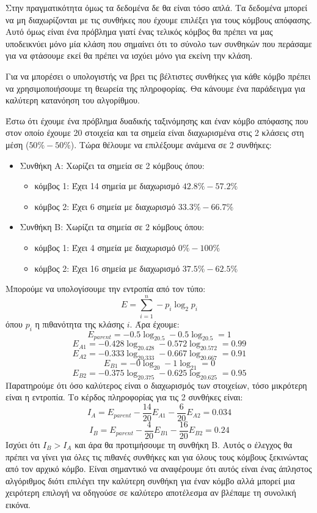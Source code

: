 Στην πραγματικότητα όμως τα δεδομένα δε θα είναι τόσο απλά. Τα δεδομένα μπορεί να μη διαχωρίζονται
με τις συνθήκες που έχουμε επιλέξει για τους κόμβους απόφασης. Αυτό όμως είναι ένα πρόβλημα γιατί
ένας τελικός κόμβος θα πρέπει να μας υποδεικνύει μόνο μία κλάση που σημαίνει ότι το σύνολο των
συνθηκών που περάσαμε για να φτάσουμε εκεί θα πρέπει να ισχύει μόνο για εκείνη την κλάση.

Για να μπορέσει ο υπολογιστής να βρει τις βέλτιστες συνθήκες για κάθε κόμβο πρέπει να
χρησιμοποιήσουμε τη θεωρεία της πληροφορίας. Θα κάνουμε ένα παράδειγμα για καλύτερη κατανόηση
του αλγορίθμου.

Έστω ότι έχουμε ένα πρόβλημα δυαδικής ταξινόμησης και έναν κόμβο απόφασης που στον οποίο έχουμε
20 στοιχεία και τα σημεία είναι διαχωρισμένα στις 2 κλάσεις στη μέση ($50\%-50\%$). Τώρα θέλουμε να
επιλέξουμε ανάμενα σε 2 συνθήκες:
\begin{itemize}
    \item Συνθήκη Α: Χωρίζει τα σημεία σε 2 κόμβους όπου:
    \begin{itemize}
        \item κόμβος 1: Έχει 14 σημεία με διαχωρισμό $42.8\%-57.2\%$
        \item κόμβος 2: Έχει 6 σημεία με διαχωρισμό $33.3\%-66.7\%$
    \end{itemize}
    \item Συνθήκη Β: Χωρίζει τα σημεία σε 2 κόμβους όπου:
    \begin{itemize}
        \item κόμβος 1: Έχει 4 σημεία με διαχωρισμό $0\%-100\%$
        \item κόμβος 2: Έχει 16 σημεία με διαχωρισμό $37.5\%-62.5\%$
    \end{itemize}
\end{itemize}
Μπορούμε να υπολογίσουμε την εντροπία από τον τύπο:
$$E=\sum\limits_{i=1}^{n}-p_i\log_2p_i$$
όπου $p_i$ η πιθανότητα της κλάσης $i$. Άρα έχουμε:
$$E_{parent}=-0.5\log_20.5-0.5\log_20.5=1$$
$$E_{A1}=-0.428\log_20.428-0.572\log_20.572=0.99$$
$$E_{A2}=-0.333\log_20.333-0.667\log_20.667=0.91$$
$$E_{B1}=-0\log_20-1\log_21=0$$
$$E_{B2}=-0.375\log_20.375-0.625\log_20.625=0.95$$
Παρατηρούμε ότι όσο καλύτερος είναι ο διαχωρισμός των στοιχείων, τόσο μικρότερη είναι η εντροπία.
Το κέρδος πληροφορίας για τις 2 συνθήκες είναι:
$$I_A=E_{parent}-\frac{14}{20}E_{A1}-\frac{6}{20}E_{A2}=0.034$$
$$I_B=E_{parent}-\frac{4}{20}E_{B1}-\frac{16}{20}E_{B2}=0.24$$
Ισχύει ότι $I_B>I_A$ και άρα θα προτιμήσουμε τη συνθήκη Β. Αυτός ο έλεγχος θα πρέπει να γίνει για
όλες τις πιθανές συνθήκες και για όλους τους κόμβους ξεκινώντας από τον αρχικό κόμβο. Είναι
σημαντικό να αναφέρουμε ότι αυτός είναι ένας άπληστος αλγόριθμος διότι επιλέγει την καλύτερη
συνθήκη για έναν κόμβο αλλά μπορεί μια χειρότερη επιλογή να οδηγούσε σε καλύτερο αποτέλεσμα αν
βλέπαμε τη συνολική εικόνα.

